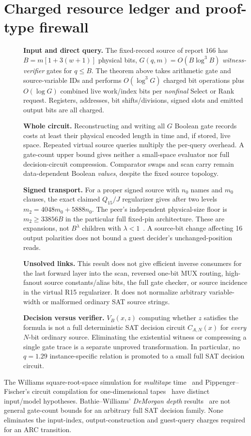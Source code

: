 \documentclass[11pt]{article}
\begin{document}
\section{Charged resource ledger and proof-type firewall}
\begin{description}
\item[] \textbf{Input and direct query.} The fixed-record
source of report 166 has
$B=m[1+3(w+1)]$ physical bits,
$G(q,m)=O(B\log^3 B)$ \emph{witness-verifier} gates
for $q\le B$. The theorem above takes arithmetic
gate and source-variable IDs and performs $O(\log^3G)$
charged bit operations plus $O(\log G)$ combined live
work/index bits per \emph{nonfinal} Select or Rank
request. Registers, addresses, bit shifts/divisions,
signed slots and emitted output bits are all charged.
\item[] \textbf{Whole circuit.} Reconstructing and writing
all $G$ Boolean gate records costs at least their
physical encoded length in time and, if stored, live
space. Repeated virtual source queries multiply the
per-query overhead. A gate-count upper bound gives
neither a small-space evaluator nor full decision-circuit
compression. Comparator swaps and scan carry remain
data-dependent Boolean \emph{values}, despite the
fixed source topology.
\item[] \textbf{Signed transport.} For a proper signed
source with $n_0$ names and $m_0$ clauses, the exact
claimed $Q_{15}/J$ regularizer gives after two levels
$m_2=4048m_0+5888n_0$. The peer's independent
physical-size floor is $m_2\ge33856B$ in the
particular full fixed-pin architecture. These are
expansions, not $B^\lambda$ children with
$\lambda<1$~\cite{floor131}. A source-bit change
affecting 16 output polarities does not bound a guest
decider's unchanged-position reads.
\item[] \textbf{Unsolved links.} This result does not
give efficient inverse consumers for the last forward
layer into the scan, reversed one-bit MUX routing,
high-fanout source constants/alias bits, the full
gate checker, or source incidence in the virtual R15
regularizer. It does not normalize arbitrary
variable-width or malformed ordinary SAT source strings.
\item[] \textbf{Decision versus verifier.}
$V_B(x,z)$ computing whether $z$ satisfies the
formula is not a full deterministic SAT decision
circuit $C_{A,N}(x)$ for \emph{every} $N$-bit
ordinary source. Eliminating the existential
witness or compressing a single gate trace is
a separate unproved transformation. In particular,
no $q=1.29$ instance-specific relation is promoted
to a small full SAT decision circuit.
\end{description}
The Williams square-root-space simulation for
\emph{multitape} time~\cite{williams} and
Pippenger--Fischer's circuit compilation for
one-dimensional tapes~\cite{pf} have distinct
input/model hypotheses. Bathie--Williams'
\emph{DeMorgan depth} results~\cite{bw} are not
general gate-count bounds for an arbitrary full
SAT decision family. None eliminates the
input-index, output-construction and guest-query
charges required for an ARC transition.
\end{document}
